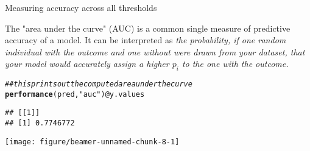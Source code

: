 \documentclass[table]{beamer}\usepackage[]{graphicx}\usepackage[]{color}
\makeatletter
\def\maxwidth{ %
  \ifdim\Gin@nat@width>\linewidth
    \linewidth
  \else
    \Gin@nat@width
  \fi
}
\newcommand{\hlstr}[1]{\textcolor[rgb]{0.192,0.494,0.8}{#1}}%
\newcommand{\hlcom}[1]{\textcolor[rgb]{0.678,0.584,0.686}{\textit{#1}}}%
\newcommand{\hlopt}[1]{\textcolor[rgb]{0,0,0}{#1}}%
\newcommand{\hlstd}[1]{\textcolor[rgb]{0.345,0.345,0.345}{#1}}%
\newcommand{\hlkwc}[1]{\textcolor[rgb]{0.333,0.667,0.333}{#1}}%
\newcommand{\hlkwd}[1]{\textcolor[rgb]{0.737,0.353,0.396}{\textbf{#1}}}%
\newenvironment{kframe}{%
 \def\at@end@of@kframe{}%
 \ifinner\ifhmode%
  \def\at@end@of@kframe{\end{minipage}}%
  \begin{minipage}{\columnwidth}%
 \fi\fi%
 \def\FrameCommand##1{\hskip\@totalleftmargin \hskip-\fboxsep
 \colorbox{shadecolor}{##1}\hskip-\fboxsep
     \hskip-\linewidth \hskip-\@totalleftmargin \hskip\columnwidth}%
 \MakeFramed {\advance\hsize-\width
   \@totalleftmargin\z@ \linewidth\hsize
   \@setminipage}}%
 {\par\unskip\endMakeFramed%
 \at@end@of@kframe}
\newenvironment{knitrout}{}{} %
\makeatother
\begin{document}

\begin{frame}[fragile]{Measuring accuracy across all thresholds}

The "area under the curve" (AUC) is a common single measure of predictive accuracy of a model. It can be interpreted as {\em the probability, if one random individual with the outcome and one without were drawn from your dataset, that your model would accurately assign a higher $p_i$ to the one with the outcome.}

\begin{knitrout}\scriptsize
{}\color{fgcolor}\begin{kframe}
\begin{alltt}
\hlcom{## this prints out the computed area under the curve}
\hlkwd{performance}\hlstd{(pred,}\hlstr{"auc"}\hlstd{)}\hlopt{@}\hlkwc{y.values}
\end{alltt}
\begin{verbatim}
## [[1]]
## [1] 0.7746772
\end{verbatim}
\end{kframe}
\end{knitrout}


\begin{knitrout}\scriptsize
{}\color{fgcolor}

{\centering \texttt{[image: figure/beamer-unnamed-chunk-8-1]} 

}



\end{knitrout}



\end{frame}



% 
% 
% 
\end{document}
